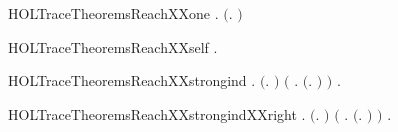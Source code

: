 \newcommand{\HOLTraceTheoremsReachXXNODES}{\UseVerbatim{HOLTraceTheoremsReachXXNODES}}
\begin{SaveVerbatim}{HOLTraceTheoremsReachXXone}
\HOLTokenTurnstile{} \HOLSymConst{\HOLTokenForall{}} . \ensuremath{(}\HOLSymConst{\HOLTokenExists{}}.  \HOLTokenTransBegin{}\HOLTokenTransEnd {}\ensuremath{)} \HOLSymConst{\HOLTokenImp{}}   
\end{SaveVerbatim}
\newcommand{\HOLTraceTheoremsReachXXone}{\UseVerbatim{HOLTraceTheoremsReachXXone}}
\begin{SaveVerbatim}{HOLTraceTheoremsReachXXself}
\HOLTokenTurnstile{} \HOLSymConst{\HOLTokenForall{}}.   
\end{SaveVerbatim}
\newcommand{\HOLTraceTheoremsReachXXself}{\UseVerbatim{HOLTraceTheoremsReachXXself}}
\begin{SaveVerbatim}{HOLTraceTheoremsReachXXstrongind}
\HOLTokenTurnstile{} \HOLSymConst{\HOLTokenForall{}}.
       \ensuremath{(}\HOLSymConst{\HOLTokenForall{}}.   \ensuremath{)} \HOLSymConst{\HOLTokenConj{}}
       \ensuremath{(}\HOLSymConst{\HOLTokenForall{}}  . \ensuremath{(}\HOLSymConst{\HOLTokenExists{}}.  \HOLTokenTransBegin{}\HOLTokenTransEnd {}\ensuremath{)} \HOLSymConst{\HOLTokenConj{}}    \HOLSymConst{\HOLTokenConj{}}    \HOLSymConst{\HOLTokenImp{}}   \ensuremath{)} \HOLSymConst{\HOLTokenImp{}}
       \HOLSymConst{\HOLTokenForall{}} .    \HOLSymConst{\HOLTokenImp{}}   
\end{SaveVerbatim}
\newcommand{\HOLTraceTheoremsReachXXstrongind}{\UseVerbatim{HOLTraceTheoremsReachXXstrongind}}
\begin{SaveVerbatim}{HOLTraceTheoremsReachXXstrongindXXright}
\HOLTokenTurnstile{} \HOLSymConst{\HOLTokenForall{}}.
       \ensuremath{(}\HOLSymConst{\HOLTokenForall{}}.   \ensuremath{)} \HOLSymConst{\HOLTokenConj{}}
       \ensuremath{(}\HOLSymConst{\HOLTokenForall{}}  .    \HOLSymConst{\HOLTokenConj{}}    \HOLSymConst{\HOLTokenConj{}} \ensuremath{(}\HOLSymConst{\HOLTokenExists{}}.  \HOLTokenTransBegin{}\HOLTokenTransEnd {}\ensuremath{)} \HOLSymConst{\HOLTokenImp{}}   \ensuremath{)} \HOLSymConst{\HOLTokenImp{}}
       \HOLSymConst{\HOLTokenForall{}} .    \HOLSymConst{\HOLTokenImp{}}   
\end{SaveVerbatim}
